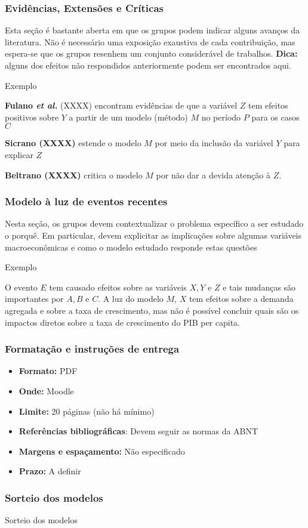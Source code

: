 \documentclass[11pt]{beamer}
\begin{document}
\begin{frame}
\frametitle{Evidências, Extensões e Críticas}

Esta seção é bastante aberta em que os grupos podem indicar alguns avanços da literatura. Não é necessário uma exposição exaustiva de cada contribuição, mas espera-se que os grupos resenhem um conjunto considerável de trabalhos. \textbf{Dica:} alguns dos efeitos não respondidos anteriormente podem ser encontrados aqui.

\begin{alertblock}{Exemplo}
	
	\textbf{Fulano \textit{et al.}} (XXXX) encontram evidências de que a variável $Z$ tem efeitos positivos sobre $Y$ a partir de um modelo (método) $M$ no período $P$ para os casos $C$
	
	\textbf{Sicrano (XXXX)} estende o modelo $M$ por meio da inclusão da variável $Y$ para explicar $Z$
	
	\textbf{Beltrano (XXXX)} critica o modelo $M$ por não dar a devida atenção à $Z$.
\end{alertblock}

\end{frame}

\begin{frame}
\frametitle{Modelo à luz de eventos recentes}

Nesta seção, os grupos devem contextualizar o problema específico a ser estudado o porquê. Em particular, devem explicitar as implicações sobre algumas variáveis macroeconômicas e como o modelo estudado responde estas questões

\begin{alertblock}{Exemplo}
	
O evento $E$ tem causado efeitos sobre as variáveis $X, Y \text{ e } Z$ e tais mudanças são importantes por $A, B \text{ e } C$. A luz do modelo $M$, $X$ tem efeitos sobre a demanda agregada e sobre a taxa de crescimento, mas não é possível concluir quais são os impactos diretos sobre a taxa de crescimento do PIB per capita.
\end{alertblock}
\end{frame}


\begin{frame}
\frametitle{Formatação e instruções de entrega}
\begin{itemize}
	\item \textbf{Formato:} PDF
	\item \textbf{Onde:} Moodle
	\item \textbf{Limite:} 20 páginas (não há mínimo)
	\item \textbf{Referências bibliográficas}: Devem seguir as normas da ABNT
	\item \textbf{Margens e espaçamento:} Não especificado
	\item \textbf{Prazo:} A definir
\end{itemize}
\end{frame}

\begin{frame}
\frametitle{Sorteio dos modelos}

\begin{table}[h]
	\caption{Sorteio dos modelos}
	
\end{table}

\end{frame}
\end{document}
